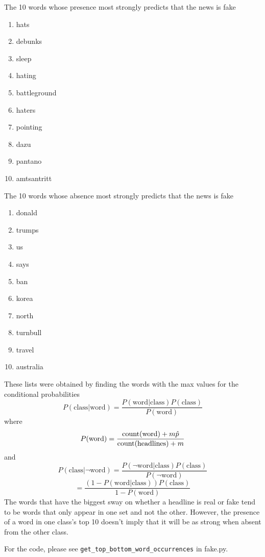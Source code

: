 \documentclass[10pt,letterpaper]{article}
\begin{document}
\begin{enumerate}
\begin{enumerate}
			The 10 words whose presence most strongly predicts that the news is fake
			\begin{enumerate}
				\item hats
				\item debunks
				\item sleep
				\item hating
				\item battleground
				\item haters
				\item pointing
				\item dazu
				\item pantano
				\item amtsantritt
			\end{enumerate}
			
			The 10 words whose absence most strongly predicts that the news is fake
			\begin{enumerate}
				\item donald
				\item trumps
				\item us
				\item says
				\item ban
				\item korea
				\item north
				\item turnbull
				\item travel
				\item australia
			\end{enumerate}
		
			These lists were obtained by finding the words with the max values for the conditional probabilities
			\[
				P(\text{class} | \text{word}) = \frac{P(\text{word} | \text{class})P(\text{class})}{P(\text{word})}
			\]
			where
			\[
				P(\text{word}) = \frac{\text{count}(\text{word}) + m\hat{p}}{\text{\text{count}}(\text{headlines}) + m}
			\]
			and
			\[
			P(\text{class} | \neg\text{word}) = \frac{P(\neg\text{word} | \text{class})P(\text{class})}{P(\neg\text{word})}
			\]
			\[
			= \frac{(1 - P(\text{word} | \text{class}))P(\text{class})}{1 - P(\text{word})}
			\]
			The words that have the biggest sway on whether a headline is real or fake tend to be words that only appear in one set and not the other.
			However, the presence of a word in one class's top 10 doesn't imply that it will be as strong when absent from the other class.
			
			
			For the code, please see \verb|get_top_bottom_word_occurrences| in fake.py.
			

\end{enumerate}
\end{enumerate}
\end{document}
